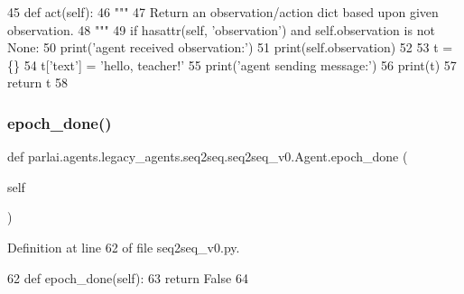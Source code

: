 \begin{DoxyCode}
45     \textcolor{keyword}{def }act(self):
46         \textcolor{stringliteral}{"""}
47 \textcolor{stringliteral}{        Return an observation/action dict based upon given observation.}
48 \textcolor{stringliteral}{        """}
49         \textcolor{keywordflow}{if} hasattr(self, \textcolor{stringliteral}{'observation'}) \textcolor{keywordflow}{and} self.observation \textcolor{keywordflow}{is} \textcolor{keywordflow}{not} \textcolor{keywordtype}{None}:
50             print(\textcolor{stringliteral}{'agent received observation:'})
51             print(self.observation)
52 
53         t = \{\}
54         t[\textcolor{stringliteral}{'text'}] = \textcolor{stringliteral}{'hello, teacher!'}
55         print(\textcolor{stringliteral}{'agent sending message:'})
56         print(t)
57         \textcolor{keywordflow}{return} t
58 
\end{DoxyCode}
\mbox{\label{classparlai_1_1agents_1_1legacy__agents_1_1seq2seq_1_1seq2seq__v0_1_1Agent_a2a9ad9d2de9befe0dca62d19ae0d797c}} 
\subsubsection{\texorpdfstring{epoch\+\_\+done()}{epoch\_done()}}
{\footnotesize\ttfamily def parlai.\+agents.\+legacy\+\_\+agents.\+seq2seq.\+seq2seq\+\_\+v0.\+Agent.\+epoch\+\_\+done (\begin{DoxyParamCaption}\item[{}]{self }\end{DoxyParamCaption})}



Definition at line 62 of file seq2seq\+\_\+v0.\+py.


\begin{DoxyCode}
62     \textcolor{keyword}{def }epoch\_done(self):
63         \textcolor{keywordflow}{return} \textcolor{keyword}{False}
64 
\end{DoxyCode}
\mbox{\label{classparlai_1_1agents_1_1legacy__agents_1_1seq2seq_1_1seq2seq__v0_1_1Agent_a8bddd5b89230c9a2810e7ca15914997e}} 
